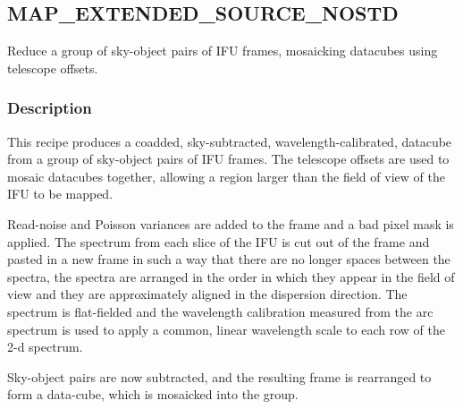 \documentclass[twoside,11pt,nolof]{starlink}
\begin{document}
\clearpage

\subsection{MAP\_EXTENDED\_SOURCE\_NOSTD}

Reduce a group of sky-object pairs of IFU frames, mosaicking datacubes
using telescope offsets.

\subsubsection*{Description}

This recipe produces a coadded, sky-subtracted, wavelength-calibrated,
datacube from a group of sky-object pairs of IFU
frames. The telescope offsets are used to mosaic datacubes together,
allowing a region larger than the field of view of the IFU to be
mapped.



Read-noise and Poisson variances are added to the frame and a bad
pixel mask is applied. The spectrum from each slice of the IFU is cut
out of the frame and pasted in a new frame in such a way that there
are no longer spaces between the spectra, the spectra are arranged in
the order in which they appear in the field of view and they are
approximately aligned in the dispersion direction. The spectrum is
flat-fielded and the wavelength calibration measured from the arc
spectrum is used to apply a common, linear wavelength scale to each
row of the 2-d spectrum.



Sky-object pairs are now subtracted, and the resulting frame is
rearranged to form a data-cube, which is mosaicked into the group.
\end{document}
